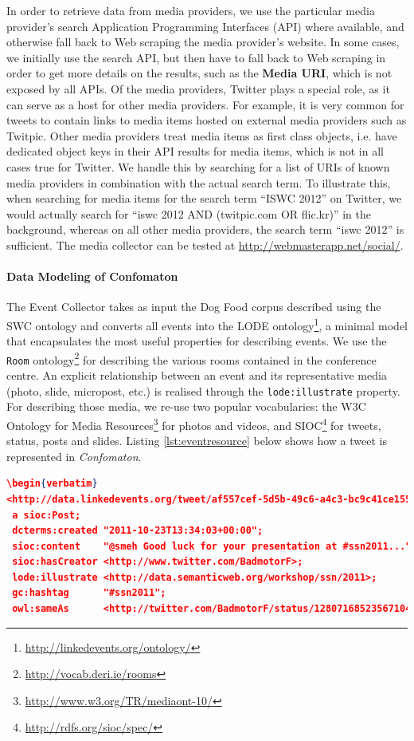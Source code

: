 In order to retrieve data from media providers, we use the particular media provider's search Application Programming Interfaces (API) where available, and otherwise fall back to Web scraping the media provider's website. In some cases, we initially use the search API, but then have to fall back to Web scraping in order to get more details on the results, such as the \textbf{Media URI}, which is not exposed by all APIs. Of the media providers, Twitter plays a special role, as it can serve as a host for other media providers. For example, it is very common for tweets to contain links to media items hosted on external media providers such as Twitpic. Other media providers treat media items as first class objects, i.e. have dedicated object keys in their API results for media items, which is not in all cases true for Twitter. We handle this by searching for a list of URIs of known media providers in combination with the actual search term. To illustrate this, when searching for media items for the search term ``ISWC 2012'' on Twitter, we would actually search for ``iswc 2012 AND (twitpic.com OR flic.kr)'' in the background, whereas on all other media providers, the search term ``iswc 2012'' is sufficient. The media collector can be tested at \url{http://webmasterapp.net/social/}.

\paragraph{Data Modeling of Confomaton}
The Event Collector takes as input the Dog Food corpus described using the SWC ontology and converts all events into the LODE ontology\footnote{\url{http://linkedevents.org/ontology/}}, a minimal model that encapsulates the most useful properties for describing events. We use the \texttt{Room} ontology\footnote{\url{http://vocab.deri.ie/rooms}} for describing the various rooms contained in the conference centre. An explicit relationship between an event and its representative media (photo, slide, micropost, etc.) is realised through the \texttt{lode:illustrate} property. For describing those media, we re-use two popular vocabularies: the W3C Ontology for Media Resources\footnote{\url{http://www.w3.org/TR/mediaont-10/}} for photos and videos, and SIOC\footnote{\url{http://rdfs.org/sioc/spec/}} for tweets, status, posts and slides. Listing \ref{lst:eventresource} below shows how a tweet is represented in \emph{Confomaton}.

\begin{lstlisting}[caption={Sample output describing a resource.}, language=json, label={lst:eventresource}]	
\begin{verbatim}
<http://data.linkedevents.org/tweet/af557cef-5d5b-49c6-a4c3-bc9c41ce1555>
 a sioc:Post;
 dcterms:created "2011-10-23T13:34:03+00:00";
 sioc:content    "@smeh Good luck for your presentation at #ssn2011...";
 sioc:hasCreator <http://www.twitter.com/BadmotorF>;
 lode:illustrate <http://data.semanticweb.org/workshop/ssn/2011>;
 gc:hashtag      "#ssn2011";
 owl:sameAs      <http://twitter.com/BadmotorF/status/128071685235671040>.
\end{lstlisting}

